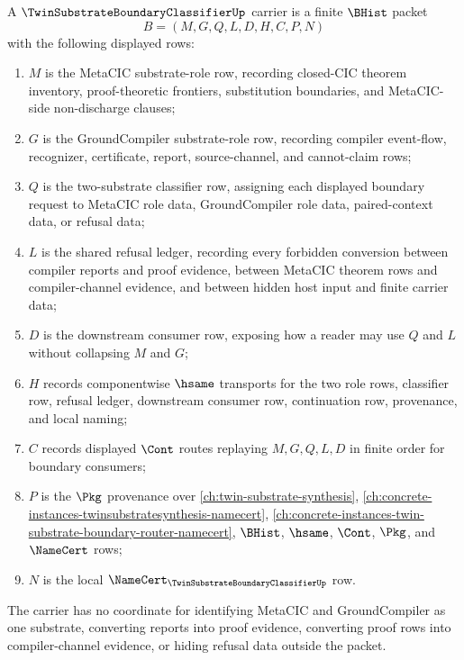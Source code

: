 \begin{definition}
\label{def:twin-substrate-boundary-classifier-carrier}
A $\TwinSubstrateBoundaryClassifierUp$ carrier is a finite $\BHist$ packet
$$
B=(M,G,Q,L,D,H,C,P,N)
$$
with the following displayed rows:
\begin{enumerate}
\item $M$ is the MetaCIC substrate-role row, recording closed-CIC theorem inventory, proof-theoretic frontiers, substitution boundaries, and MetaCIC-side non-discharge clauses;
\item $G$ is the GroundCompiler substrate-role row, recording compiler event-flow, recognizer, certificate, report, source-channel, and cannot-claim rows;
\item $Q$ is the two-substrate classifier row, assigning each displayed boundary request to MetaCIC role data, GroundCompiler role data, paired-context data, or refusal data;
\item $L$ is the shared refusal ledger, recording every forbidden conversion between compiler reports and proof evidence, between MetaCIC theorem rows and compiler-channel evidence, and between hidden host input and finite carrier data;
\item $D$ is the downstream consumer row, exposing how a reader may use $Q$ and $L$ without collapsing $M$ and $G$;
\item $H$ records componentwise $\hsame$ transports for the two role rows, classifier row, refusal ledger, downstream consumer row, continuation row, provenance, and local naming;
\item $C$ records displayed $\Cont$ routes replaying $M,G,Q,L,D$ in finite order for boundary consumers;
\item $P$ is the $\Pkg$ provenance over \autoref{ch:twin-substrate-synthesis}, \autoref{ch:concrete-instances-twinsubstratesynthesis-namecert}, \autoref{ch:concrete-instances-twin-substrate-boundary-router-namecert}, $\BHist$, $\hsame$, $\Cont$, $\Pkg$, and $\NameCert$ rows;
\item $N$ is the local $\NameCert_{\TwinSubstrateBoundaryClassifierUp}$ row.
\end{enumerate}
The carrier has no coordinate for identifying MetaCIC and GroundCompiler as one substrate, converting reports into proof evidence, converting proof rows into compiler-channel evidence, or hiding refusal data outside the packet.
\end{definition}

